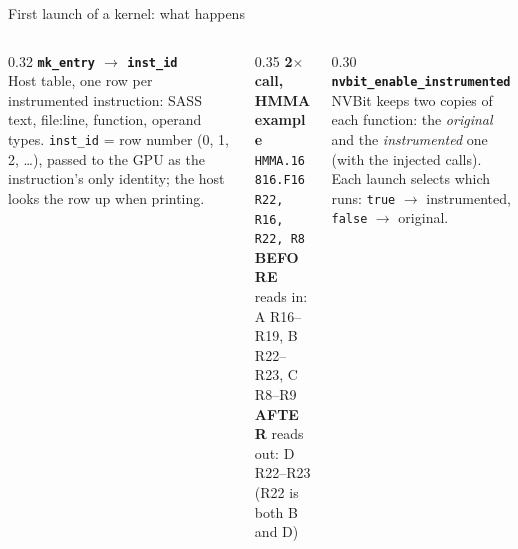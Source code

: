\documentclass[aspectratio=169,10pt]{beamer}
\begin{document}
\begin{frame}{First launch of a kernel: what happens}
\centering
{}

\vspace{0mm}
\begin{columns}[T]
\begin{column}{0.32\textwidth}\scriptsize
\textbf{\texttt{mk\_entry} $\to$ \texttt{inst\_id}}\\
Host table, one row per instrumented instruction: SASS text, file:line, function, operand types. \texttt{inst\_id} = row number (0, 1, 2, \dots), passed to the GPU as the instruction's only identity; the host looks the row up when printing.
\end{column}
\begin{column}{0.35\textwidth}\scriptsize
\textbf{2$\times$ call, HMMA example}\\
\texttt{HMMA.16816.F16 R22, R16, R22, R8}\\
\textbf{BEFORE} reads in: A R16--R19, B R22--R23, C R8--R9\\
\textbf{AFTER} reads out: D R22--R23\\
(R22 is both B and D)
\end{column}
\begin{column}{0.30\textwidth}\scriptsize
\textbf{\texttt{nvbit\_enable\_instrumented}}\\
NVBit keeps two copies of each function: the \emph{original} and the \emph{instrumented} one (with the injected calls). Each launch selects which runs: \texttt{true} $\to$ instrumented, \texttt{false} $\to$ original.
\end{column}
\end{columns}
\end{frame}
\end{document}
